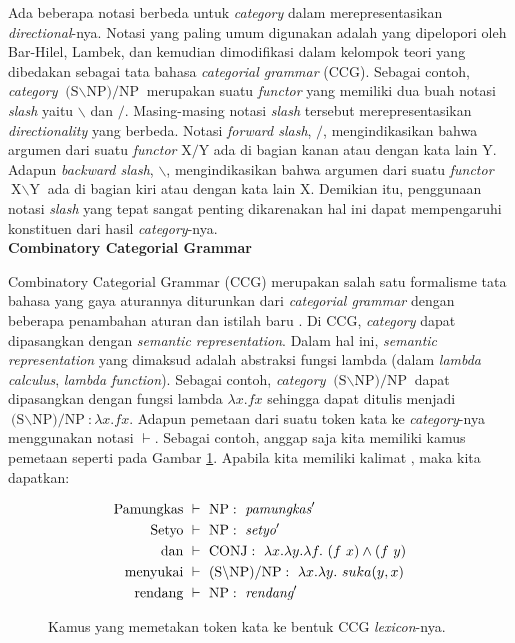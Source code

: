 Ada beberapa notasi berbeda untuk \textit{category} dalam merepresentasikan \textit{directional}-nya.
Notasi yang paling umum digunakan adalah  yang dipelopori oleh Bar-Hilel,
Lambek, dan kemudian dimodifikasi dalam kelompok teori yang dibedakan sebagai tata bahasa
 \textit{categorial grammar} (CCG).
Sebagai contoh, \textit{category} $\text{(S$\backslash$NP)/NP}$ merupakan suatu \textit{functor} yang
memiliki dua buah notasi \textit{slash} yaitu $\backslash$ dan $/$.
Masing-masing notasi \textit{slash} tersebut merepresentasikan \textit{directionality} yang berbeda.
Notasi \textit{forward slash}, $/$, mengindikasikan bahwa argumen dari suatu \textit{functor}
$\text{X}/\text{Y}$ ada di bagian kanan atau dengan kata lain $\text{Y}$.
Adapun \textit{backward slash}, $\backslash$, mengindikasikan bahwa argumen dari suatu \textit{functor}
$\text{X}\backslash\text{Y}$ ada di bagian kiri atau dengan kata lain $\text{X}$.
Demikian itu, penggunaan notasi \textit{slash} yang tepat sangat penting dikarenakan hal ini dapat
mempengaruhi konstituen dari hasil  \textit{category}-nya.
\\


\noindent\textbf{Combinatory Categorial Grammar}\label{kajian-ccg}

Combinatory Categorial Grammar (CCG) merupakan salah satu formalisme tata bahasa yang gaya aturannya
diturunkan dari \textit{categorial grammar} dengan beberapa penambahan aturan dan istilah baru
\citep{Steedman96avery}.
Di CCG, \textit{category} dapat dipasangkan dengan \textit{semantic representation}.
Dalam hal ini, \textit{semantic representation} yang dimaksud adalah abstraksi fungsi lambda
(dalam \textit{lambda calculus}, \textit{lambda function}).
Sebagai contoh, \textit{category} $\text{(S$\backslash$NP)/NP}$ dapat dipasangkan dengan fungsi lambda
$\lambda{x. fx}$ sehingga dapat ditulis menjadi $\text{(S$\backslash$NP)/NP} : \lambda{x. fx}$.
Adapun pemetaan dari suatu token kata ke \textit{category}-nya menggunakan notasi $\vdash$.
Sebagai contoh, anggap saja kita memiliki kamus pemetaan seperti pada Gambar \ref{ccg:mapping:1}.
Apabila kita memiliki kalimat , maka kita dapatkan:

\begin{figure}\centering\small
  \begin{align*}
    \text{Pamungkas} &\ \vdash\ \text{NP}:\ \so{pamungkas}\\
    \text{Setyo} &\ \vdash\ \text{NP}:\ \so{setyo}\\
    \text{dan} &\ \vdash\ \text{CONJ}:\ \lambda x.\lambda y.\lambda f.\ (f\ x) \land (f\ y)\\
    \text{menyukai} &\ \vdash\ \text{(S{$\backslash$}NP)/NP}:\ \lambda x.\lambda y.\ suka(y, x)\\
    \text{rendang} &\ \vdash\ \text{NP}:\ \so{rendang}
  \end{align*}
  \caption{Kamus yang memetakan token kata ke bentuk CCG \textit{lexicon}-nya.}
  \label{ccg:mapping:1}
\end{figure}

